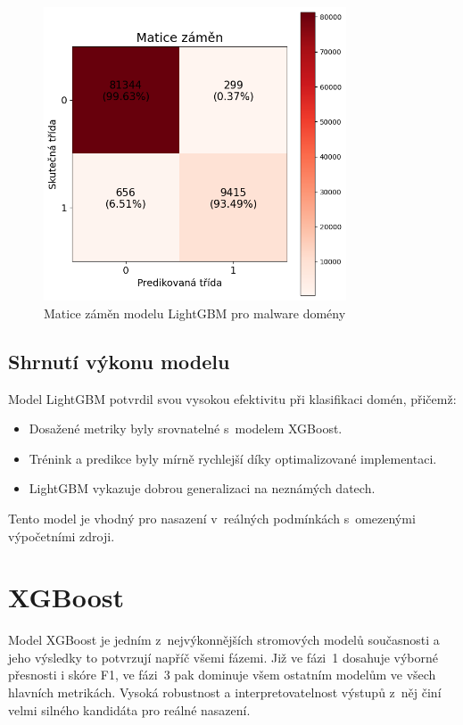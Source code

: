 \begin{figure}[H]
    \centering
    \includegraphics[width=0.8\textwidth]{obrazky-figures/Lgbm_stage_3_malware_v1.1_confusion_matrix.png}
    \caption{Matice záměn modelu LightGBM pro malware domény}
    \label{fig:lgbm_conf_matrix_malware}
\end{figure}

\subsection{Shrnutí výkonu modelu}

Model LightGBM potvrdil svou vysokou efektivitu při klasifikaci domén, přičemž:
\begin{itemize}
    \item Dosažené metriky byly srovnatelné s~modelem XGBoost.
    \item Trénink a predikce byly mírně rychlejší díky optimalizované implementaci.
    \item LightGBM vykazuje dobrou generalizaci na neznámých datech.
\end{itemize}

Tento model je vhodný pro nasazení v~reálných podmínkách s~omezenými výpočetními zdroji.




\section{XGBoost}\label{res:xgb}
Model XGBoost je jedním z~nejvýkonnějších stromových modelů současnosti a jeho výsledky to potvrzují napříč všemi fázemi. Již ve fázi~1 dosahuje výborné přesnosti i skóre F1, ve fázi~3 pak dominuje všem ostatním modelům ve všech hlavních metrikách. Vysoká robustnost a interpretovatelnost výstupů z~něj činí velmi silného kandidáta pro reálné nasazení.



